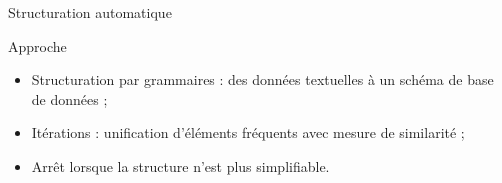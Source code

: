\begin{frame}{Structuration automatique}
\begin{adjustbox}{max width=\linewidth}
{}
    \end{adjustbox}

    \vfill

    \begin{block}{Approche}
        \begin{itemize}
            \item Structuration par grammaires : des données textuelles à un schéma de base de données ;
            \item Itérations : unification d'éléments fréquents avec mesure de similarité ;
            \item Arrêt lorsque la structure n'est plus simplifiable.%
        \end{itemize}
    \end{block}
\end{frame}





